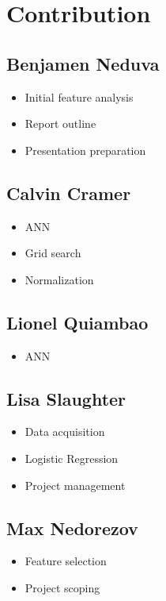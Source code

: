 \documentclass[letterpaper, 12 pt, conference]{ieeeconf}  %
\begin{document}
\section{Contribution}

\subsection*{Benjamen Neduva}
        \begin{itemize}
                \item Initial feature analysis
                \item Report outline
                \item Presentation preparation
        \end{itemize}

\subsection*{Calvin Cramer}
        \begin{itemize}
                \item ANN
                \item Grid search
                \item Normalization
        \end{itemize}

\subsection*{Lionel Quiambao}
        \begin{itemize}
                \item ANN
        \end{itemize}

\subsection*{Lisa Slaughter}
        \begin{itemize}
                \item Data acquisition
                \item Logistic Regression
                \item Project management
        \end{itemize}

\subsection*{Max Nedorezov}
        \begin{itemize}
                \item Feature selection
                \item Project scoping
        \end{itemize}
\end{document}
